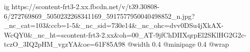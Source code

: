  
 
 
 
 

\ifcmt
  ig https://scontent-frt3-2.xx.fbcdn.net/v/t39.30808-6/272769869_5050232268341169_5917577950040498852_n.jpg?_nc_cat=103&ccb=1-5&_nc_sid=730e14&_nc_ohc=dvv0DSu4jXkAX-WcQY0&_nc_ht=scontent-frt3-2.xx&oh=00_AT-9jfChDIIXqrpEl2SKlHG2G2c-tczO_3IQ2pHM_vgzYA&oe=61F85A98
  @width 0.4
  @minipage 0.4
  @wrap \parpic[r]
\fi
